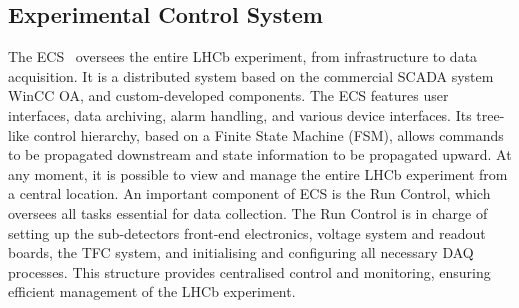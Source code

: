 \subsection{Experimental Control System}

The ECS~\cite{GranadoCardoso:2702137} oversees the entire LHCb experiment, from infrastructure to data acquisition. It is a distributed system based on the commercial SCADA system WinCC OA, and custom-developed components. The ECS features user interfaces, data archiving, alarm handling, and various device interfaces. Its tree-like control hierarchy, based on a Finite State Machine (FSM), allows commands to be propagated downstream and state information to be propagated upward. 
At any moment, it is possible to view and manage the entire LHCb experiment from a central location. An important component of ECS is the Run Control, which oversees all tasks essential for data collection. The Run Control is in charge of setting up the sub-detectors front-end electronics, voltage system and readout boards, the TFC system, and initialising and configuring all necessary DAQ processes.
This structure provides centralised control and monitoring, ensuring efficient management of the LHCb experiment.

